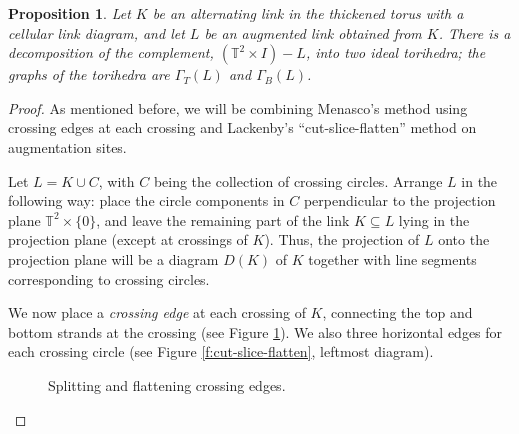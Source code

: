 \documentclass[11pt]{amsart}
\newcommand{\figref}[1]{Figure \ref{#1}}
\newcommand{\torus}{{\mathbb{T}^2}}
\theoremstyle{plain}
\newtheorem{prop}[theorem]{Proposition}
\theoremstyle{definition}
\begin{document}
\begin{prop}\label{p:tori_decomp}
Let $K$ be an alternating link in the thickened torus
with a cellular link diagram,
and let $L$ be an augmented link obtained from $K$.
There is a decomposition of the complement,
$(\torus \times I) - L$, into two ideal torihedra;
the graphs of the torihedra are $\Gamma_T(L)$ and $\Gamma_B(L)$.
\end{prop}


\begin{proof}
As mentioned before, we will be combining
Menasco's method using crossing edges at each crossing
and Lackenby's ``cut-slice-flatten'' method
on augmentation sites.


Let $L = K \cup C$, with $C$ being the collection of crossing circles.
Arrange $L$ in the following way:
place the circle components in $C$ perpendicular to
the projection plane $\torus \times \{0\}$,
and leave the remaining part of the link $K \subseteq L$
lying in the projection plane (except at crossings of $K$).
Thus, the projection of $L$ onto the projection plane
will be a diagram $D(K)$ of $K$
together with line segments corresponding to crossing circles.


We now place a \emph{crossing edge} at each crossing of $K$,
connecting the top and bottom strands at the crossing
(see \figref{f:crossing-edges}).
We also three horizontal edges for each crossing circle
(see \figref{f:cut-slice-flatten}, leftmost diagram).

\begin{figure} 

\label{f:crossing-edges}
\caption{Splitting and flattening crossing edges.}
\end{figure}



\end{proof}
\end{document}
